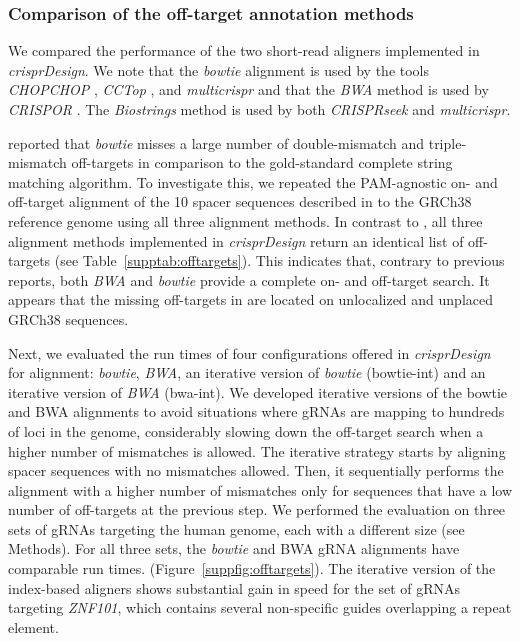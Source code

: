 \documentclass[pdftex,english,10pt]{article}
\begin{document}
\subsubsection*{Comparison of the off-target annotation methods}


We compared the performance of the two short-read aligners implemented in \textit{crisprDesign}.
We note that the \textit{bowtie} alignment is used by the tools \textit{CHOPCHOP} \citep{chopchop}, \textit{CCTop} \citep{cctop}, and \textit{multicrispr} \citep{multicrispr} and that the \textit{BWA} method is used by \textit{CRISPOR} \citep{crispor}. The \textit{Biostrings} method is used by both \textit{CRISPRseek} \citep{crisprseek} and \textit{multicrispr}.

\citet{multicrispr} reported that \textit{bowtie} misses a large number of double-mismatch
and triple-mismatch off-targets in comparison to the gold-standard complete string matching algorithm.
To investigate this, we repeated the PAM-agnostic on- and off-target alignment of the 10 spacer sequences described in \citet{multicrispr} to the GRCh38 reference genome using all three alignment methods. In contrast to \citet{multicrispr}, all three alignment methods implemented in \textit{crisprDesign} return an identical list of off-targets (see Table~\ref{supptab:offtargets}). This indicates that, contrary to previous reports, both \textit{BWA} and \textit{bowtie} provide a complete on- and off-target search. It appears that the missing off-targets in \citet{multicrispr} are located on unlocalized and unplaced GRCh38 sequences.

Next, we evaluated the run times of four configurations offered in \textit{crisprDesign} for alignment: \textit{bowtie}, \textit{BWA}, an iterative version of \textit{bowtie} (bowtie-int) and an iterative version of \textit{BWA} (bwa-int). We developed iterative versions of the bowtie and BWA alignments to avoid situations where gRNAs are mapping to hundreds of loci in the genome, considerably slowing down the off-target search when a higher number of mismatches is allowed.  The iterative strategy starts by aligning spacer sequences with no mismatches allowed. Then, it sequentially performs the alignment with a higher number of mismatches only for sequences that have a low number of off-targets at the previous step.  We performed the evaluation on three sets of gRNAs targeting the human genome, each with a different size (see Methods). 
For all three sets, the \textit{bowtie} and BWA gRNA alignments have comparable run times. (Figure~\ref{suppfig:offtargets}).
The iterative version of the index-based aligners shows substantial gain in speed for the set of gRNAs targeting \textit{ZNF101}, which contains several non-specific guides overlapping a repeat element. 
\end{document}
